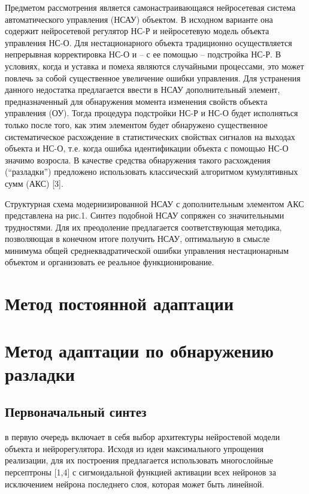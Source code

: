 Предметом рассмотрения является самонастраивающаяся нейросетевая
система автоматического управления (НСАУ) объектом. В исходном
варианте она содержит нейросетевой регулятор НС-Р и нейросетевую
модель объекта управления НС-О. Для нестационарного объекта
традиционно осуществляется непрерывная корректировка НС-О и – с ее
помощью – подстройка НС-Р. В условиях, когда и уставка и помеха
являются случайными процессами, это может повлечь за собой
существенное увеличение ошибки управления. Для устранения данного
недостатка предлагается ввести в НСАУ дополнительный элемент,
предназначенный для обнаружения момента изменения свойств объекта
управления (ОУ). Тогда процедура подстройки НС-Р и НС-О будет
исполняться только после того, как этим элементом будет обнаружено
существенное систематическое расхождение в статистических свойствах
сигналов на выходах объекта и НС-О, т.е. когда ошибка идентификации
объекта с помощью НС-О значимо возросла. В качестве средства
обнаружения такого расхождения (``разладки'') предложено использовать
классический алгоритмом кумулятивных сумм (АКС) [3].

Структурная схема модернизированной НСАУ с дополнительным элементом
АКС представлена на рис.1. Синтез подобной НСАУ сопряжен со
значительными трудностями. Для их преодоление предлагается
соответствующая методика, позволяющая в конечном итоге получить НСАУ,
оптимальную в смысле минимума общей среднеквадратической ошибки
управления нестационарным объектом и организовать ее реальное
функционирование.

\section{Метод постоянной адаптации}
\section{Метод адаптации по обнаружению разладки}
\subsection{Первоначальный синтез}

в первую очередь включает в себя выбор архитектуры нейростевой модели
объекта и нейрорегулятора. Исходя из идеи максимального упрощения
реализации, для их построения предлагается использовать многослойные
персептроны [1,4] с сигмоидальной функцией активации всех нейронов за
исключением нейрона последнего слоя, которая может быть линейной.

